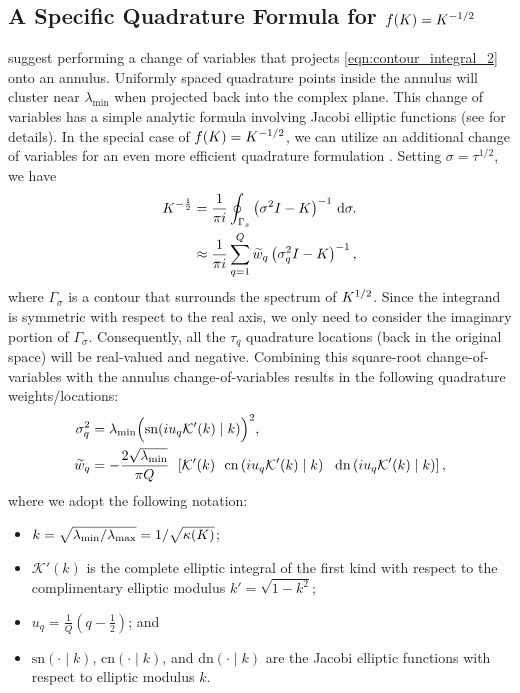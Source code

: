 \subsection{A Specific Quadrature Formula for $f(K) = K^{-1/2}$}
\citet{hale2008computing} suggest performing a change of variables that projects \cref{eqn:contour_integral_2} onto an annulus.
Uniformly spaced quadrature points inside the annulus will cluster near $\lambda_\text{min}$ when projected back into the complex plane.
This change of variables has a simple analytic formula involving Jacobi elliptic functions (see \citep[][Sec. 2]{hale2008computing} for details).
In the special case of $f(K) = K^{-1/2}$, we can utilize an additional change of variables for an even more efficient quadrature formulation \citep[][Sec. 4]{hale2008computing}.
Setting $\sigma = \tau^{1/2}$, we have
%
\begin{align}
	K^{-\frac 1 2}
  &= \frac{1}{\pi i} \oint_{\Gamma_s} \left( \sigma^2 I - K \right)^{-1} \,\mathrm{d}{\sigma}.
  \nonumber
  \\
  &\approx
  \frac{1}{\pi i} \sum_{q=1}^Q \widetilde w_q \left( \sigma_q^2 I - K \right)^{-1},
  \label{eqn:contour_integral_quad_3}
\end{align}
%
where $\Gamma_\sigma$ is a contour that surrounds the spectrum of $K^{1/2}$.
Since the integrand is symmetric with respect to the real axis, we only need to consider the imaginary portion of $\Gamma_\sigma$.
Consequently, all the $\tau_q$ quadrature locations (back in the original space) will be real-valued and negative.
Combining this square-root change-of-variables with the annulus change-of-variables results in the following quadrature weights/locations:
%
\begin{equation}
  \begin{split}
    \sigma_q^2
    &= \lambda_\text{min} \Bigl( \text{sn}(i u_q \mathcal{K}'(k) \mid k) \Bigr)^2,
    \\
    \widetilde w_q
    &= -\frac{ 2 \sqrt{\lambda_\text{min}} }{ \pi Q }
    \:\: \left[
    \mathcal{K}'( k )
    \:\:\: \text{cn} \left( i u_q \mathcal{K}'(k) \mid k \right)
    \:\:\: \text{dn} \left( i u_q \mathcal{K}'(k) \mid k \right)
    \right],
  \end{split}
  \label{eqn:quad_points_and_locations}
\end{equation}
%
where we adopt the following notation:
\begin{itemize}
  \item $k = \sqrt{ \lambda_\text{min} / \lambda_\text{max} } = 1 / \sqrt{ \kappa(K) }$;
  \item $\mathcal{K}'(k)$ is the complete elliptic integral of the first kind with respect to the complimentary elliptic modulus $k' = \sqrt{1 - k^2}$;
  \item $u_q = \frac{1}{Q}(q - \frac 1 2)$; and
  \item $\text{sn}(\cdot \mid k)$, $\text{cn}(\cdot \mid k )$, and $\text{dn}(\cdot \mid k)$ are the Jacobi elliptic functions with respect to elliptic modulus $k$.
\end{itemize}
